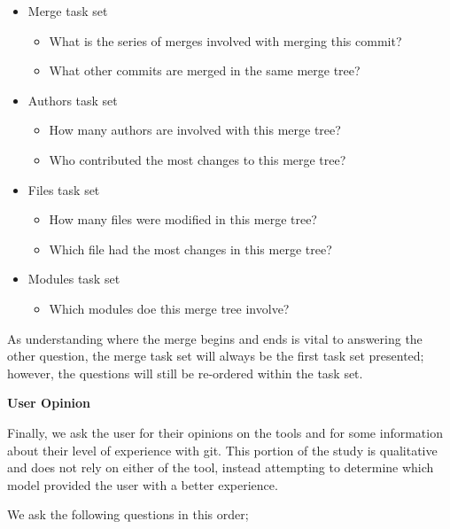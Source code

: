 \begin{itemize}
  \item Merge task set
    \begin{itemize}
      \item What is the series of merges involved with merging this
        commit?
      \item What other commits are merged in the same merge tree?
    \end{itemize}

  \item Authors task set
    \begin{itemize}
      \item How many authors are involved with this merge tree?
      \item Who contributed the most changes to this merge tree?
    \end{itemize}

  \item Files task set
    \begin{itemize}
      \item How many files were modified in this merge tree?
      \item Which file had the most changes in this merge tree?
    \end{itemize}

  \item Modules task set
    \begin{itemize}
      \item Which modules doe this merge tree involve?
    \end{itemize}
\end{itemize}

As understanding where the merge begins and ends is vital to answering
the other question, the merge task set will always be the first task set
presented; however, the questions will still be re-ordered within the
task set.


\textbf{User Opinion}

Finally, we ask the user for their opinions on the tools and for some
information about their level of experience with git. This portion of
the study is qualitative and does not rely on either of the tool,
instead attempting to determine which model provided the user with a
better experience.

We ask the following questions in this order;

